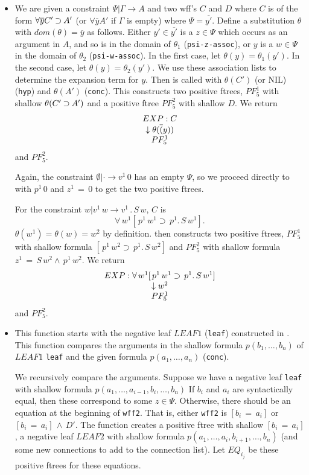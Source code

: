 \begin{enumerate}
\begin{itemize}
\item {\bf {}}
We are given a constraint $\Psi|\Gamma\rightarrow A$ and two wff's $C$ and $D$
where $C$ is of the form
$\forall \overline{y} C' \mathbin{\supset} A'$
(or $\forall \overline{y} A'$ if $\Gamma$ is empty)
where $\Psi=\overline{y'}$.  Define a substitution $\theta$ with $dom(\theta) = \overline{y}$
as follows.
Either $y'\in\overline{y'}$ is a $z\in\Psi$ which occurs as an argument in $A$,
and so is in the domain of $\theta_1$ (\verb+psi-z-assoc+), or
$y$ is a $w\in\Psi$ in the domain of $\theta_2$ (\verb+psi-w-assoc+).
In the first case, let $\theta(y) = \theta_1(y')$.  In the second case,
let $\theta(y) = \theta_2(y')$.
We use these association lists to determine
the expansion term for $y$.  
Then 
is called with $\theta(C')$ (or NIL) (\verb+hyp+) and $\theta(A')$ (\verb+conc+).
This constructs two positive ftrees, 
$PF_5^1$ with shallow $\theta(C'\mathbin{\supset} A')$
and a positive ftree $PF_5^2$ with shallow $D$.
We return
$${{\begin{array}[t]{c}EXP: C \\ \begin{array}[t]{c} \downarrow \theta(\overline(y)) \\ PF_5^1\end{array}\end{array}}}$$
and $PF_5^2$.

Again, the constraint $\emptyset |\cdot\rightarrow v^1\, 0$ has an empty $\Psi$,
so we proceed directly to 
with
$p^1 \,0$
and
$z^1 \,= \,0$ to get the two positive ftrees.

For the constraint $w |v^1\, w\rightarrow v^1\, . \, S\, w$,
$C$ is
$$\forall \,w^1 [ \,p^1 \,w^1 \supset \,p^1 . \,S \,w^1 ].$$
$\theta(w^1) = \theta(w) = w^2$ by definition.
 then constructs
two positive ftrees, $PF_5^1$ with shallow formula
$[ \,p^1 \,w^2 \supset \,p^1 . \,S \,w^2 ]$
and $PF_5^2$ with shallow formula 
$z^1 \,= \,S \,w^2 \land \,p^1 \,w^2$.
We return
$${{\begin{array}[t]{c}EXP: \forall \,w^1 [ \,p^1 \,w^1 \supset \,p^1 . \,S \,w^1 ] \\ \begin{array}[t]{c} \downarrow w^2 \\ PF_5^1\end{array}\end{array}}}$$
and $PF_5^2$.

\item {\bf {}}
This function starts with the negative leaf $LEAF1$ (\verb+leaf+)
constructed in .
This function compares the arguments in the shallow formula
$p(b_1,\ldots,b_n)$ of $LEAF1$ \verb+leaf+
and the given formula $p(a_1,\ldots,a_n)$ (\verb+conc+).  

We recursively compare the arguments.  Suppose we have a negative
leaf \verb+leaf+ with shallow formula
$p(a_1,\ldots,a_{i-1},b_i,\ldots,b_n)$
If $b_i$ and $a_i$ are syntactically equal,
then these correspond to some $z\in\Psi$.  Otherwise,
there should be an equation at the beginning of \verb+wff2+.
That is, either \verb+wff2+ is $[b_i\, =\,a_i]$ or $[b_i\,=\,a_i]\,\land \,D'.$
The function  creates a positive ftree
with shallow $[b_i\, = \, a_i]$, a negative leaf $LEAF2$ with
shallow formula $p(a_1,\ldots,a_i,b_{i+1},\ldots,b_n)$
(and some new connections to add to the connection list).
Let $EQ_{i_j}$ be these positive ftrees for these equations.


\end{itemize}
\end{enumerate}
